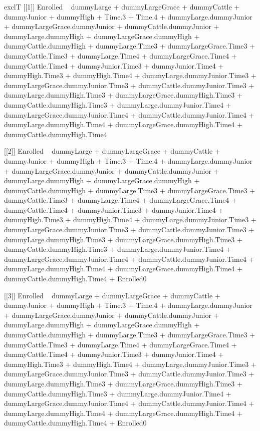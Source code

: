 \begin{Schunk}
\begin{Soutput}
[1] exclT
[[1]]
Enrolled ~ dummyLarge + dummyLargeGrace + dummyCattle + dummyJunior + 
    dummyHigh + Time.3 + Time.4 + dummyLarge.dummyJunior + dummyLargeGrace.dummyJunior + 
    dummyCattle.dummyJunior + dummyLarge.dummyHigh + dummyLargeGrace.dummyHigh + 
    dummyCattle.dummyHigh + dummyLarge.Time3 + dummyLargeGrace.Time3 + 
    dummyCattle.Time3 + dummyLarge.Time4 + dummyLargeGrace.Time4 + 
    dummyCattle.Time4 + dummyJunior.Time3 + dummyJunior.Time4 + 
    dummyHigh.Time3 + dummyHigh.Time4 + dummyLarge.dummyJunior.Time3 + 
    dummyLargeGrace.dummyJunior.Time3 + dummyCattle.dummyJunior.Time3 + 
    dummyLarge.dummyHigh.Time3 + dummyLargeGrace.dummyHigh.Time3 + 
    dummyCattle.dummyHigh.Time3 + dummyLarge.dummyJunior.Time4 + 
    dummyLargeGrace.dummyJunior.Time4 + dummyCattle.dummyJunior.Time4 + 
    dummyLarge.dummyHigh.Time4 + dummyLargeGrace.dummyHigh.Time4 + 
    dummyCattle.dummyHigh.Time4

[[2]]
Enrolled ~ dummyLarge + dummyLargeGrace + dummyCattle + dummyJunior + 
    dummyHigh + Time.3 + Time.4 + dummyLarge.dummyJunior + dummyLargeGrace.dummyJunior + 
    dummyCattle.dummyJunior + dummyLarge.dummyHigh + dummyLargeGrace.dummyHigh + 
    dummyCattle.dummyHigh + dummyLarge.Time3 + dummyLargeGrace.Time3 + 
    dummyCattle.Time3 + dummyLarge.Time4 + dummyLargeGrace.Time4 + 
    dummyCattle.Time4 + dummyJunior.Time3 + dummyJunior.Time4 + 
    dummyHigh.Time3 + dummyHigh.Time4 + dummyLarge.dummyJunior.Time3 + 
    dummyLargeGrace.dummyJunior.Time3 + dummyCattle.dummyJunior.Time3 + 
    dummyLarge.dummyHigh.Time3 + dummyLargeGrace.dummyHigh.Time3 + 
    dummyCattle.dummyHigh.Time3 + dummyLarge.dummyJunior.Time4 + 
    dummyLargeGrace.dummyJunior.Time4 + dummyCattle.dummyJunior.Time4 + 
    dummyLarge.dummyHigh.Time4 + dummyLargeGrace.dummyHigh.Time4 + 
    dummyCattle.dummyHigh.Time4 + Enrolled0

[[3]]
Enrolled ~ dummyLarge + dummyLargeGrace + dummyCattle + dummyJunior + 
    dummyHigh + Time.3 + Time.4 + dummyLarge.dummyJunior + dummyLargeGrace.dummyJunior + 
    dummyCattle.dummyJunior + dummyLarge.dummyHigh + dummyLargeGrace.dummyHigh + 
    dummyCattle.dummyHigh + dummyLarge.Time3 + dummyLargeGrace.Time3 + 
    dummyCattle.Time3 + dummyLarge.Time4 + dummyLargeGrace.Time4 + 
    dummyCattle.Time4 + dummyJunior.Time3 + dummyJunior.Time4 + 
    dummyHigh.Time3 + dummyHigh.Time4 + dummyLarge.dummyJunior.Time3 + 
    dummyLargeGrace.dummyJunior.Time3 + dummyCattle.dummyJunior.Time3 + 
    dummyLarge.dummyHigh.Time3 + dummyLargeGrace.dummyHigh.Time3 + 
    dummyCattle.dummyHigh.Time3 + dummyLarge.dummyJunior.Time4 + 
    dummyLargeGrace.dummyJunior.Time4 + dummyCattle.dummyJunior.Time4 + 
    dummyLarge.dummyHigh.Time4 + dummyLargeGrace.dummyHigh.Time4 + 
    dummyCattle.dummyHigh.Time4 + Enrolled0


\end{Soutput}
\end{Schunk}
